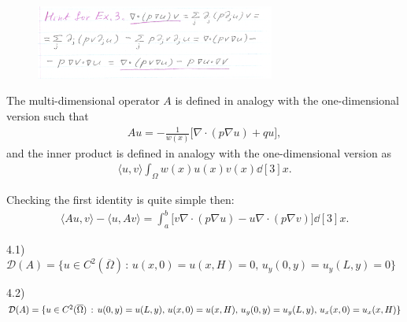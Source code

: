 \begin{figure}[H]
\begin{center}
    \includegraphics[width=0.7\textwidth]{hint3.png}
\end{center} 
\end{figure}

The multi-dimensional operator $A$ is defined in analogy with the one-dimensional version such that
\begin{eqnarray}
    \label{eq:operator-A-multidim}
    Au = -\frac{1}{w(x)} \Big[ \nabla \cdot (p \nabla u) + qu \Big] 
,\end{eqnarray}
and the inner product is defined in analogy with the one-dimensional version as
\begin{eqnarray}
    \label{eq:inner-product-multidim}
    \langle u,v \rangle \int_{\Omega} w(x) u(x) v(x) \dd[3]{x}
.\end{eqnarray}

Checking the first identity is quite simple then:
\begin{align}
    \label{eq:Green-identity-1-verify}
    \langle Au,v \rangle - \langle u,Av \rangle = \int_{a}^{b} \Big[ v \nabla \cdot (p \nabla u) - u \nabla \cdot (p \nabla v) \Big] \dd[3]{x}
.\end{align}



4.1) $\mathcal{D}(A) = \{ u \in C^2(\overline{\Omega}) \,:\, u(x,0) = u(x,H) = 0,\, u_{y}(0,y) = u_{y}(L,y) = 0 \}$

4.2) $\mathcal{D}(A) = \{ u \in C^2(\overline{\Omega}) \,:\, u(0,y) = u(L,y), \, u(x,0) = u(x,H),\, u_{y}(0,y) = u_{y}(L,y), \\ \, u_{x}(x,0) = u_{x}(x,H) \}$





